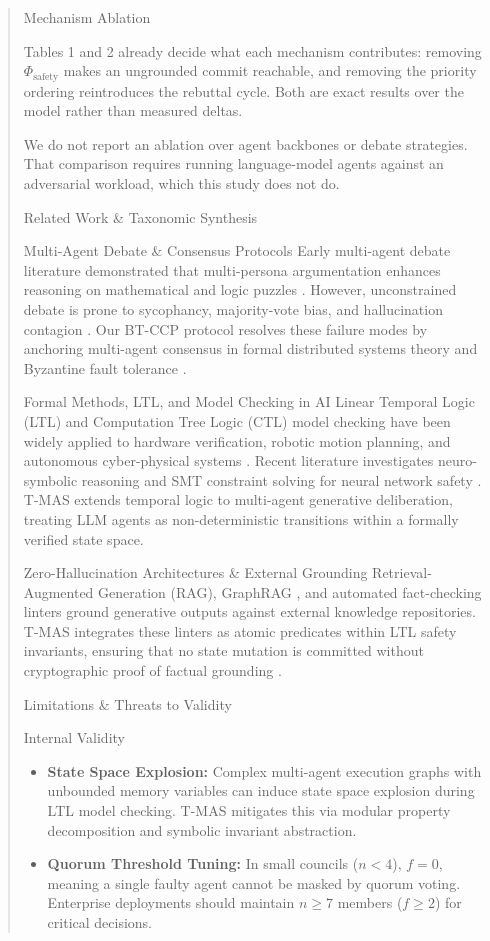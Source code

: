 \documentclass[10pt,journal,compsoc,twocolumn]{IEEEtran}
\begin{document}
\begin{quote}
{ Mechanism Ablation

Tables 1 and 2 already decide what each mechanism contributes: removing $\Phi_{\text{safety}}$ makes an ungrounded commit reachable, and removing the priority ordering reintroduces the rebuttal cycle. Both are exact results over the model rather than measured deltas.

We do not report an ablation over agent backbones or debate strategies. That comparison requires running language-model agents against an adversarial workload, which this study does not do.



 Related Work \& Taxonomic Synthesis

 Multi-Agent Debate \& Consensus Protocols
Early multi-agent debate literature demonstrated that multi-persona argumentation enhances reasoning on mathematical and logic puzzles \cite{arxiv_2005_14165,arxiv_2203_02155}. However, unconstrained debate is prone to sycophancy, majority-vote bias, and hallucination contagion \cite{arxiv_2406_00584}. Our BT-CCP protocol resolves these failure modes by anchoring multi-agent consensus in formal distributed systems theory and Byzantine fault tolerance \cite{crossref_10_1109_access_2026_3656309}.

 Formal Methods, LTL, and Model Checking in AI
Linear Temporal Logic (LTL) and Computation Tree Logic (CTL) model checking have been widely applied to hardware verification, robotic motion planning, and autonomous cyber-physical systems \cite{crossref_10_18653_v1_2026_findings_acl_1933}. Recent literature investigates neuro-symbolic reasoning and SMT constraint solving for neural network safety \cite{arxiv_2404_01131}. T-MAS extends temporal logic to multi-agent generative deliberation, treating LLM agents as non-deterministic transitions within a formally verified state space.

 Zero-Hallucination Architectures \& External Grounding
Retrieval-Augmented Generation (RAG), GraphRAG \cite{arxiv_2501_14050}, and automated fact-checking linters ground generative outputs against external knowledge repositories. T-MAS integrates these linters as atomic predicates within LTL safety invariants, ensuring that no state mutation is committed without cryptographic proof of factual grounding \cite{arxiv_2405_01543,crossref_10_1201_9788743808145_14}.



 Limitations \& Threats to Validity

 Internal Validity
\begin{itemize}
  \item \textbf{State Space Explosion:} Complex multi-agent execution graphs with unbounded memory variables can induce state space explosion during LTL model checking. T-MAS mitigates this via modular property decomposition and symbolic invariant abstraction.
  \item \textbf{Quorum Threshold Tuning:} In small councils ($n < 4$), $f = 0$, meaning a single faulty agent cannot be masked by quorum voting. Enterprise deployments should maintain $n \ge 7$ members ($f \ge 2$) for critical decisions.
\end{itemize}

}
\end{quote}
\end{document}
